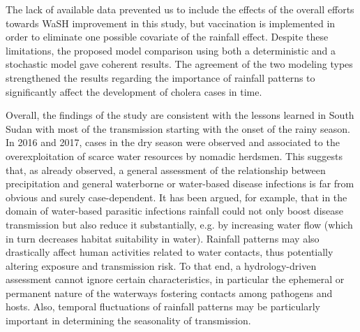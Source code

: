 The lack of available data prevented us to include the effects of the overall efforts towards WaSH improvement in this study, but vaccination is implemented in order to eliminate one possible covariate of the rainfall effect. 
Despite these limitations, the proposed model comparison using both a deterministic and a stochastic model gave coherent results. The agreement of the two modeling types strengthened the results regarding the importance of rainfall patterns to significantly affect the development of cholera cases in time.

Overall, the findings of the study are consistent with the lessons learned in South Sudan with most of the transmission starting with the onset of the rainy season. In 2016 and 2017, cases in the dry season were observed and associated to the overexploitation of scarce water resources by nomadic herdsmen. This suggests that, as already observed, a general assessment of the relationship between precipitation and general waterborne or water-based disease infections is far from obvious and surely case-dependent. It has been argued, for example, that in the domain of water-based parasitic infections rainfall could not only boost disease transmission but also reduce it substantially\cite[-12\baselineskip]{McCreesh:ChallengesPredictingEffects:2013}, e.g. by increasing water flow (which in turn decreases habitat suitability in water). Rainfall patterns may also drastically affect human activities related to water contacts, thus potentially altering exposure and transmission risk\cite{Lai:SpatialDistributionSchistosomiasis:2015}. To that end, a hydrology-driven assessment cannot ignore certain characteristics, in particular the ephemeral or permanent nature of the waterways fostering contacts among pathogens and hosts\cite{Perez-Saez:HydrologyDensityFeedbacks:2016}. Also, temporal fluctuations of rainfall patterns may be particularly important in determining the seasonality of transmission\cite{Bertuzzo:HydroclimatologyDualpeakAnnual:2012,Bertuzzo:PredictionSpatialEvolution:2011,McCreesh:PredictingEffectsClimate:2015,Perez-Saez:HydrologyDensityFeedbacks:2016}.


